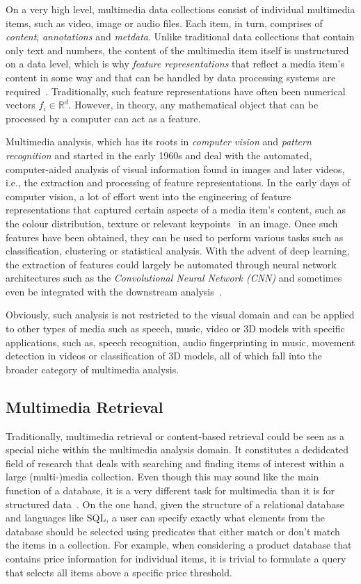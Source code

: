 On a very high level, multimedia data collections consist of individual multimedia items, such as video, image or audio files. Each item, in turn, comprises of \emph{content}, \emph{annotations} and \emph{metdata}. Unlike traditional data collections that contain only text and numbers, the content of the multimedia item itself is unstructured on a data level, which is why \emph{feature representations} that reflect a media item's content in some way and that can be handled by data processing systems are required~\cite{Zahalka:2014towards}. Traditionally, such feature representations have often been numerical vectors $f_i \in \mathbb{R}^d$. However, in theory, any mathematical object that can be processed by a computer can act as a feature. 

Multimedia analysis, which has its roots in \emph{computer vision} and \emph{pattern recognition} and started in the early 1960s and deal with the automated, computer-aided analysis of visual information found in images and later videos, i.e., the extraction and processing of feature representations. In the early days of computer vision, a lot of effort went into the engineering of feature representations that captured certain aspects of a media item's content, such as the colour distribution, texture or relevant keypoints~\cite{Lowe:1999object,Bay:2006surf} in an image. Once such features have been obtained, they can be used to perform various tasks such as classification, clustering or statistical analysis. With the advent of deep learning, the extraction of features could largely be automated through neural network architectures such as the \emph{Convolutional Neural Network (CNN)} and sometimes even be integrated with the downstream analysis~\cite{Goodfellow:2016deep}. 

Obviously, such analysis is not restricted to the visual domain and can be applied to other types of media such as speech, music, video or 3D models with specific applications, such as, speech recognition, audio fingerprinting in music, movement detection in videos or classification of 3D models, all of which fall into the broader category of multimedia analysis.

\subsection{Multimedia Retrieval}

Traditionally, multimedia retrieval or content-based retrieval could be seen as a special niche within the  multimedia analysis domain. It constitutes a dedidcated field of research that deals with searching and finding items of interest within a large (multi-)media collection. Even though this may sound like the main function of a database, it is a very different task for multimedia than it is for structured data~\cite{Blanken:2007multimedia}. On the one hand, given the structure of a relational database and languages like SQL, a user can specify exactly what elements from the database should be selected using predicates that either match or don't match the items in a collection. For example, when considering a product database that contains price information for individual items, it is trivial to formulate a query that selects all items above a specific price threshold.

